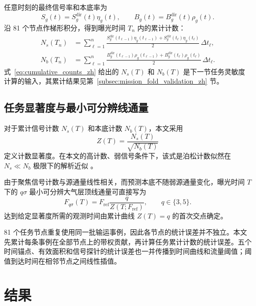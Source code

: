 \documentclass[11pt]{article}
\newcommand{\fref}{F_{\mathrm{ref}}}
\begin{document}
任意时刻的最终信号率和本底率为
\begin{equation}
 S_g(t)=S^{\mathrm{dir}}_g(t)\eta_g(t),\qquad
 B_g(t)=B^{\mathrm{dir}}_g(t)\rho_g(t).
 \label{eq:final_time_rates_zh}
\end{equation}
沿 81 个节点作梯形积分，得到曝光时间 $T_n$ 内的累计计数：
\begin{equation}
 \begin{aligned}
 N_s(T_n)&=\sum_{\ell=1}^{n}\frac{S^{\mathrm{dir}}_g(t_{\ell-1})\eta_g(t_{\ell-1})+S^{\mathrm{dir}}_g(t_\ell)\eta_g(t_\ell)}{2}\,\Delta t_\ell,\\
 N_b(T_n)&=\sum_{\ell=1}^{n}\frac{B^{\mathrm{dir}}_g(t_{\ell-1})\rho_g(t_{\ell-1})+B^{\mathrm{dir}}_g(t_\ell)\rho_g(t_\ell)}{2}\,\Delta t_\ell.
 \end{aligned}
 \label{eq:cumulative_counts_zh}
\end{equation}
式~\eqref{eq:cumulative_counts_zh} 给出的 $N_s(T)$ 和 $N_b(T)$ 是下一节任务灵敏度计算的输入，其累计结果见第~\ref{subsec:mission_fold_validation_zh} 节。

\subsection{任务显著度与最小可分辨线通量}
\label{sec:mission_sensitivity_zh}

对于累计信号计数 $N_s(T)$ 和本底计数 $N_b(T)$，本文采用
\begin{equation}
 Z(T)=\frac{N_s(T)}{\sqrt{N_b(T)}}
 \label{eq:mission_significance_zh}
\end{equation}
定义计数显著度。在本文的高计数、弱信号条件下，该式是泊松计数似然在 $N_s\ll N_b$ 极限下的解析近似 \cite{Cowan2011}。

由于聚焦信号计数与源通量线性相关，而预测本底不随弱源通量变化，曝光时间 $T$ 下的 $q\sigma$ 最小可分辨大气层顶线通量可直接写为
\begin{equation}
 F_{q\sigma}(T)=\fref\frac{q}{Z(T;\fref)},
 \qquad q\in\{3,5\}.
 \label{eq:minimum_flux_zh}
\end{equation}
达到给定显著度所需的观测时间由累计曲线 $Z(T)=q$ 的首次交点确定。

81 个任务节点重复使用同一批输运事例，因此各节点的统计误差并不独立。本文先累计每条事例在全部节点上的带权贡献，再计算任务累计计数的统计误差。五个时间锚点、有效面积和信号探针的统计误差也一并传播到时间曲线和流量阈值；阈值到达时间在相邻节点之间线性插值。


\section{结果}
\label{sec:results}
\end{document}
